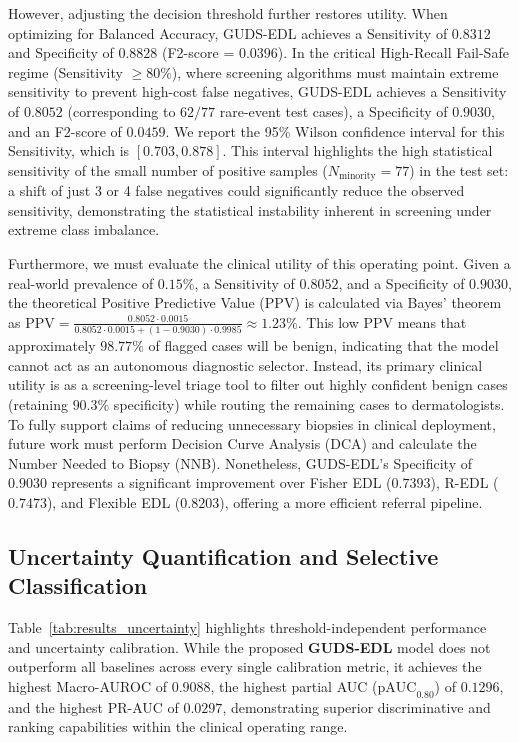 \documentclass[letterpaper]{article} %
\begin{document}
However, adjusting the decision threshold further restores utility. When optimizing for Balanced Accuracy, GUDS-EDL achieves a Sensitivity of $\mathbf{0.8312}$ and Specificity of $\mathbf{0.8828}$ (F2-score = $\mathbf{0.0396}$). In the critical High-Recall Fail-Safe regime (Sensitivity $\ge 80\%$), where screening algorithms must maintain extreme sensitivity to prevent high-cost false negatives, GUDS-EDL achieves a Sensitivity of $0.8052$ (corresponding to $62/77$ rare-event test cases), a Specificity of $\mathbf{0.9030}$, and an F2-score of $\mathbf{0.0459}$. We report the 95\% Wilson confidence interval for this Sensitivity, which is $[0.703, 0.878]$. This interval highlights the high statistical sensitivity of the small number of positive samples ($N_{\text{minority}} = 77$) in the test set: a shift of just 3 or 4 false negatives could significantly reduce the observed sensitivity, demonstrating the statistical instability inherent in screening under extreme class imbalance.

Furthermore, we must evaluate the clinical utility of this operating point. Given a real-world prevalence of $0.15\%$, a Sensitivity of $0.8052$, and a Specificity of $0.9030$, the theoretical Positive Predictive Value (PPV) is calculated via Bayes' theorem as $\text{PPV} = \frac{0.8052 \cdot 0.0015}{0.8052 \cdot 0.0015 + (1 - 0.9030) \cdot 0.9985} \approx 1.23\%$. This low PPV means that approximately $98.77\%$ of flagged cases will be benign, indicating that the model cannot act as an autonomous diagnostic selector. Instead, its primary clinical utility is as a screening-level triage tool to filter out highly confident benign cases (retaining $90.3\%$ specificity) while routing the remaining cases to dermatologists. To fully support claims of reducing unnecessary biopsies in clinical deployment, future work must perform Decision Curve Analysis (DCA) and calculate the Number Needed to Biopsy (NNB). Nonetheless, GUDS-EDL's Specificity of $0.9030$ represents a significant improvement over Fisher EDL ($0.7393$), R-EDL ($0.7473$), and Flexible EDL ($0.8203$), offering a more efficient referral pipeline.

\subsection{Uncertainty Quantification and Selective Classification}

Table~\ref{tab:results_uncertainty} highlights threshold-independent performance and uncertainty calibration. While the proposed \textbf{GUDS-EDL} model does not outperform all baselines across every single calibration metric, it achieves the highest Macro-AUROC of $\mathbf{0.9088}$, the highest partial AUC ($\text{pAUC}_{0.80}$) of $\mathbf{0.1296}$, and the highest PR-AUC of $\mathbf{0.0297}$, demonstrating superior discriminative and ranking capabilities within the clinical operating range.
\end{document}
